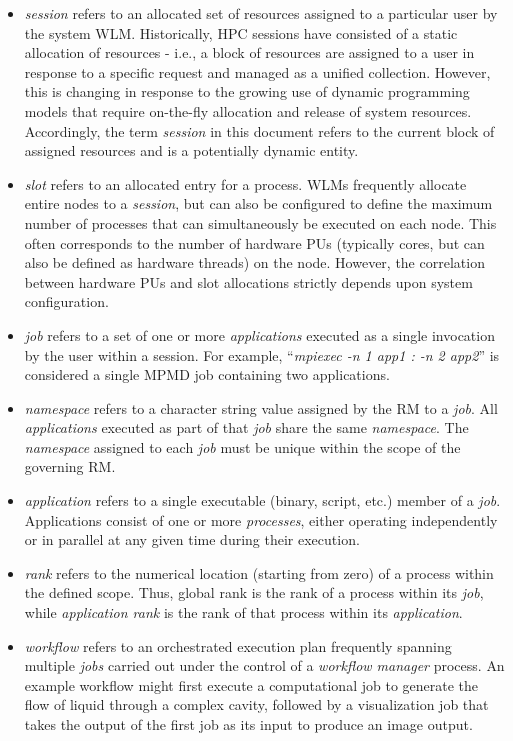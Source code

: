 \begin{itemize}
\item \emph{session} refers to an allocated set of resources assigned to a particular user by the system \ac{WLM}. Historically, \ac{HPC} sessions have consisted of a static allocation of resources - i.e., a block of resources are assigned to a user in response to a specific request and managed as a unified collection. However, this is changing in response to the growing use of dynamic programming models that require on-the-fly allocation and release of system resources. Accordingly, the term \emph{session} in this document refers to the current block of assigned resources and is a potentially dynamic entity.
\item \emph{slot} refers to an allocated entry for a process. \acp{WLM} frequently allocate entire nodes to a \emph{session}, but can also be configured to define the maximum number of processes that can simultaneously be executed on each node. This often corresponds to the number of hardware \acp{PU} (typically cores, but can also be defined as hardware threads) on the node. However, the correlation between hardware \acp{PU} and slot allocations strictly depends upon system configuration.
\item \emph{job} refers to a set of one or more \emph{applications} executed as a single invocation by the user within a session. For example, ``\textit{mpiexec -n 1 app1 : -n 2 app2}'' is considered a single \ac{MPMD} job containing two applications.
\item \emph{namespace} refers to a character string value assigned by the \ac{RM} to a \textit{job}. All \textit{applications} executed as part of that \textit{job} share the same \emph{namespace}. The \emph{namespace} assigned to each \emph{job} must be unique within the scope of the governing \ac{RM}.
\item \emph{application} refers to a single executable (binary, script, etc.) member of a \emph{job}. Applications consist of one or more \emph{processes}, either operating independently or in parallel at any given time during their execution.
\item \emph{rank} refers to the numerical location (starting from zero) of a process within the defined scope. Thus, {global rank} is the rank of a process within its \emph{job}, while \emph{application rank} is the rank of that process within its \emph{application}.
\item \emph{workflow} refers to an orchestrated execution plan frequently spanning multiple \emph{jobs} carried out under the control of a \emph{workflow manager} process. An example workflow might first execute a computational job to generate the flow of liquid through a complex cavity, followed by a visualization job that takes the output of the first job as its input to produce an image output.

\end{itemize}
